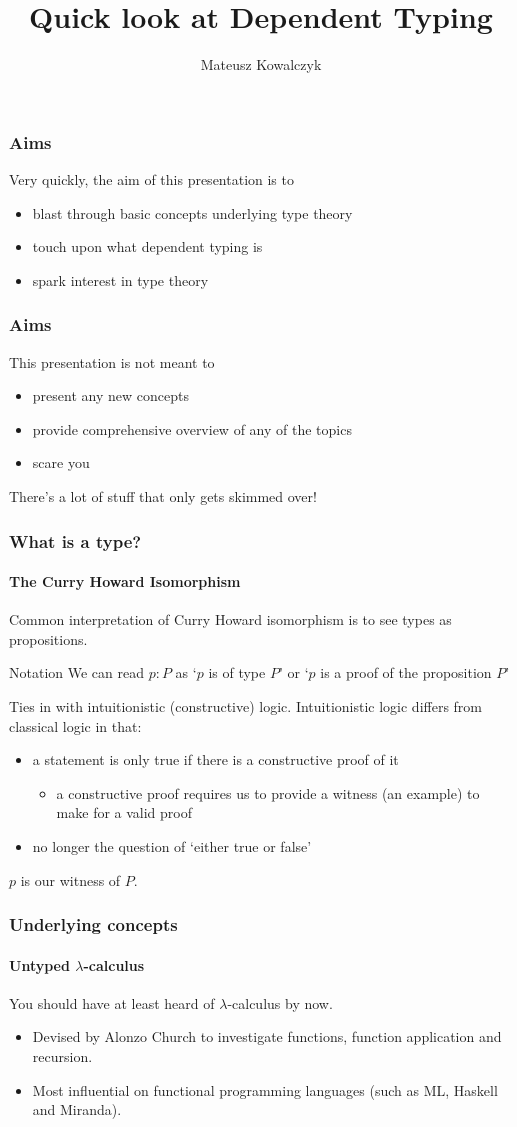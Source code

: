 \documentclass{beamer}
\title[Dependent Types]{Quick look at Dependent Typing}
\author{Mateusz Kowalczyk}
\institute{University of Bath}
\begin{document}
\begin{frame}
  \titlepage
\end{frame}
\begin{frame}
  \frametitle{Aims}
  Very quickly, the aim of this presentation is to
  \pause
  \begin{itemize}[<+->]
    \item blast through basic concepts underlying type theory
    \item touch upon what dependent typing is
    \item spark interest in type theory
    \end{itemize}
\end{frame}
\begin{frame}
  \frametitle{Aims}
  This presentation is not meant to
  \pause
  \begin{itemize}[<+->]
    \item present any new concepts
    \item provide comprehensive overview of any of the topics
    \item scare you
  \end{itemize}
  \pause
  There's a lot of stuff that only gets skimmed over!
\end{frame}
\begin{frame}
  \frametitle{What is a type?}
  \framesubtitle{The Curry Howard Isomorphism}
  Common interpretation of Curry Howard isomorphism is to see types as
  propositions.
  \pause
  \begin{exampleblock}{Notation}
    We can read $p:P$ as `$p$ is of type $P$' or `$p$ is a proof of the
    proposition $P$'
  \end{exampleblock}
  \pause
  Ties in with intuitionistic (constructive) logic. Intuitionistic
  logic differs from classical logic in that:
  \pause
  \begin{itemize}[<+->]
    \item a statement is only true if there is a constructive proof of
      it
    \begin{itemize}
      \item a constructive proof requires us to provide a witness
          (an example) to make for a valid proof
    \end{itemize}
    \item no longer the question of `either true or false'
  \end{itemize}
  \pause
  $p$ is our witness of $P$.
\end{frame}
\begin{frame}
  \frametitle{Underlying concepts}
  \framesubtitle{Untyped $\lambda$-calculus }
  You should have at least heard of $\lambda$-calculus by now.
  \pause
  \begin{itemize}[<+->]
    \item Devised by Alonzo Church to investigate functions, function
      application and recursion.
    \item Most influential on functional programming languages (such as ML,
      Haskell and Miranda).
  \end{itemize}
\end{frame}
\end{document}
